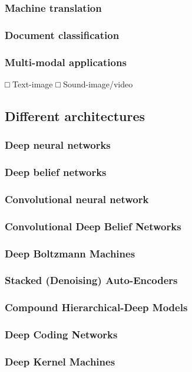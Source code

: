 \documentclass[]{article}
\begin{document}
\subsubsection{Machine translation}
\subsubsection{Document classification}
\subsubsection{Multi-modal applications}
	□ Text-image
	□ Sound-image/video
\subsection{Different architectures}
\subsubsection{Deep neural networks}

\subsubsection{Deep belief networks}
\subsubsection{Convolutional neural network}
\subsubsection{Convolutional Deep Belief Networks}
\subsubsection{Deep Boltzmann Machines}
\subsubsection{Stacked (Denoising) Auto-Encoders}
\subsubsection{Compound Hierarchical-Deep Models}
\subsubsection{Deep Coding Networks}
\subsubsection{Deep Kernel Machines}
\end{document}
